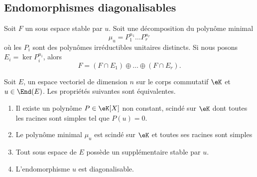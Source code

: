 \subsection{Endomorphismes diagonalisables}

\begin{lemma}       \label{LemgnaEOk}
    Soit \( F\) un sous espace stable par \( u\). Soit une décomposition du polynôme minimal
    \begin{equation}
        \mu_u=P_1^{n_1}\ldots P_r^{n_r}
    \end{equation}
    où les \( P_i\) sont des polynômes irréductibles unitaires distincts. Si nous posons \( E_i=\ker P_i^{n_i}\), alors
    \begin{equation}
        F=(F\cap E_1)\oplus\ldots \oplus(F\cap E_r).
    \end{equation}
\end{lemma}

\begin{theorem}     \label{ThoDigLEQEXR}
    Soit \( E\), un espace vectoriel de dimension \( n\) sur le corps commutatif \( \eK\) et \( u\in\End(E)\). Les propriétés suivantes sont équivalentes.
    \begin{enumerate}
        \item       \label{ItemThoDigLEQEXRi}
            Il existe un polynôme \( P\in\eK[X]\) non constant, scindé sur \(\eK\) dont toutes les racines sont simples tel que \( P(u)=0\).
        \item\label{ItemThoDigLEQEXRii}
            Le polynôme minimal \( \mu_u\) est scindé sur \(\eK\) et toutes ses racines sont simples
        \item\label{ItemThoDigLEQEXRiii}
            Tout sous espace de \( E\) possède un supplémentaire stable par \( u\).
        \item\label{ItemThoDigLEQEXRiv}
            L'endomorphisme \( u\) est diagonalisable.
    \end{enumerate}

\end{theorem}

